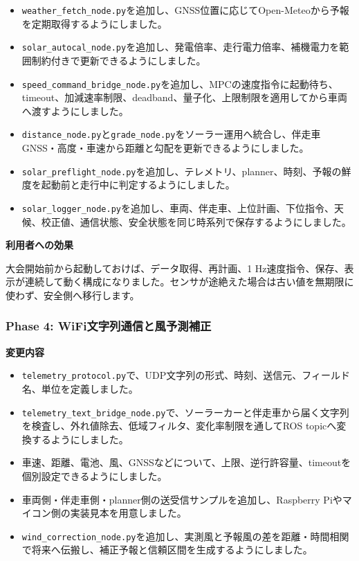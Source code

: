 \documentclass[
  japanese,
  a4paper,
  11pt]{article}
\providecommand{\tightlist}{%
  \setlength{\itemsep}{0pt}\setlength{\parskip}{0pt}}
\begin{document}
\begin{itemize}
\tightlist
\item
  \texttt{weather\_fetch\_node.py}を追加し、GNSS位置に応じてOpen-Meteoから予報を定期取得するようにしました。
\item
  \texttt{solar\_autocal\_node.py}を追加し、発電倍率、走行電力倍率、補機電力を範囲制約付きで更新できるようにしました。
\item
  \texttt{speed\_command\_bridge\_node.py}を追加し、MPCの速度指令に起動待ち、timeout、加減速率制限、deadband、量子化、上限制限を適用してから車両へ渡すようにしました。
\item
  \texttt{distance\_node.py}と\texttt{grade\_node.py}をソーラー運用へ統合し、伴走車GNSS・高度・車速から距離と勾配を更新できるようにしました。
\item
  \texttt{solar\_preflight\_node.py}を追加し、テレメトリ、planner、時刻、予報の鮮度を起動前と走行中に判定するようにしました。
\item
  \texttt{solar\_logger\_node.py}を追加し、車両、伴走車、上位計画、下位指令、天候、校正値、通信状態、安全状態を同じ時系列で保存するようにしました。
\end{itemize}

\textbf{利用者への効果}

大会開始前から起動しておけば、データ取得、再計画、1
Hz速度指令、保存、表示が連続して動く構成になりました。センサが途絶えた場合は古い値を無期限に使わず、安全側へ移行します。

\subsubsection{Phase 4:
WiFi文字列通信と風予測補正}\label{phase-4-wifiux6587ux5b57ux5217ux901aux4fe1ux3068ux98a8ux4e88ux6e2cux88dcux6b63}

\textbf{変更内容}

\begin{itemize}
\tightlist
\item
  \texttt{telemetry\_protocol.py}で、UDP文字列の形式、時刻、送信元、フィールド名、単位を定義しました。
\item
  \texttt{telemetry\_text\_bridge\_node.py}で、ソーラーカーと伴走車から届く文字列を検査し、外れ値除去、低域フィルタ、変化率制限を通してROS
  topicへ変換するようにしました。
\item
  車速、距離、電池、風、GNSSなどについて、上限、逆行許容量、timeoutを個別設定できるようにしました。
\item
  車両側・伴走車側・planner側の送受信サンプルを追加し、Raspberry
  Piやマイコン側の実装見本を用意しました。
\item
  \texttt{wind\_correction\_node.py}を追加し、実測風と予報風の差を距離・時間相関で将来へ伝搬し、補正予報と信頼区間を生成するようにしました。
\end{itemize}
\end{document}
